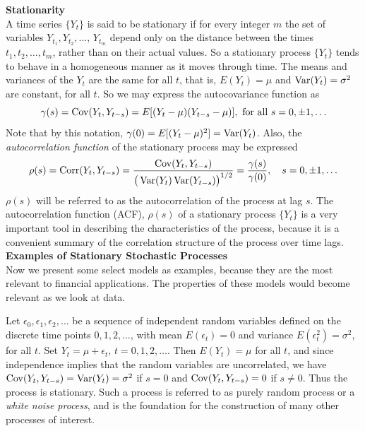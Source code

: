 \noindent \textbf{Stationarity} \\


A time series $\{Y_t \}$ is said to be stationary if for every integer $m$ the set of variables $Y_{t_1}, Y_{t_2}, \ldots, \, Y_{t_m}$ depend only on the distance between the times $t_1, t_2, \ldots, t_m$, rather than on their actual values.  So a stationary process $\{Y_t \}$ tends to behave in a homogeneous manner as it moves through time. The means and variances of the $Y_t$ are the same for all $t$, that is, $E(Y_t) = \mu$ and  $\operatorname{Var}(Y_t)= \sigma^2$ are constant, for all $t$. So we may express the autocovariance function as 
	\begin{equation} \label{eqn:2gammas}
	\gamma(s)= \cov(Y_t,Y_{t - s})= E[(Y_t - \mu)(Y_{t - s} - \mu)], \text{ for all } s= 0, \pm 1, \ldots
	\end{equation}
Note that by this notation, $\gamma(0) = E[(Y_t - \mu)^2] = \operatorname{Var}(Y_t)$. Also, the \emph{autocorrelation function} of the stationary process may be expressed
        	\begin{equation} \label{eqn:2rhos}
	\rho(s)= \corr(Y_t,Y_{t - s})= \dfrac{\cov(Y_t,Y_{t - s})}{\big( \var(Y_t) \var(Y_{t-s}) \big)^{1/2}} = \dfrac{\gamma(s)}{\gamma(0)},  \quad  s= 0, \pm 1, \ldots
	\end{equation}
$\rho(s)$ will be referred to as the autocorrelation of the process at lag $s$. The autocorrelation function (ACF), $\rho(s)$ of a stationary process $\{Y_t\}$ is a very important tool in describing the characteristics of the process, because it is a convenient summary of the correlation structure of the process over time lags.  \\


\noindent \textbf{Examples of Stationary Stochastic Processes} \\


Now we present some select models as examples, because they are the most relevant to financial applications. The properties of these models would become relevant as we look at data. 


\begin{ex} \label{ex:whitenoise} Let $\epsilon_0, \epsilon_1, \epsilon_2, \ldots$ be a sequence of independent random variables defined on the discrete time points $0,1, 2, \ldots$, with mean $E(\epsilon_{t})= 0$ and variance $E(\epsilon_{t}^2)= \sigma^2$, for all $t$. Set $Y_t = \mu + \epsilon_t, \, t= 0, 1, 2, \ldots$. Then $E(Y_t)= \mu$ for all $t$, and since independence implies that the random variables are uncorrelated, we have $\operatorname{Cov}(Y_t,Y_{t-s})= \operatorname{Var}(Y_t)= \sigma^2$ if $s=0$ and $\operatorname{Cov}(Y_t,Y_{t-s})= 0$ if $s \neq 0$. Thus the process is stationary. Such a process is referred to as purely random process or a \emph{white noise process}, and is the foundation for the construction of many other processes of interest. \xqed
\end{ex}


